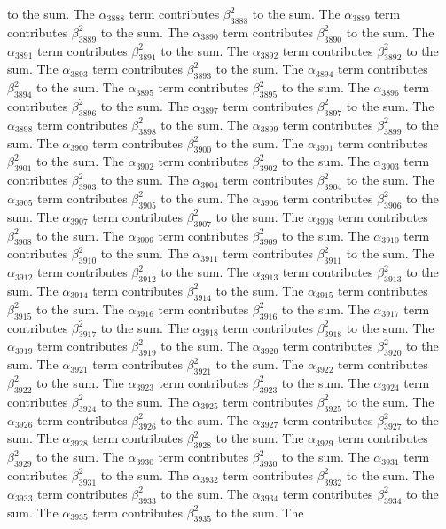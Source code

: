 \begin{lemma}
to the sum. The $\alpha_{3888}$ term contributes $\beta_{3888}^{2}$ to the sum. The $\alpha_{3889}$ term contributes $\beta_{3889}^{2}$ to the sum. The $\alpha_{3890}$ term contributes $\beta_{3890}^{2}$ to the sum. The $\alpha_{3891}$ term contributes $\beta_{3891}^{2}$ to the sum. The $\alpha_{3892}$ term contributes $\beta_{3892}^{2}$ to the sum. The $\alpha_{3893}$ term contributes $\beta_{3893}^{2}$ to the sum. The $\alpha_{3894}$ term contributes $\beta_{3894}^{2}$ to the sum. The $\alpha_{3895}$ term contributes $\beta_{3895}^{2}$ to the sum. The $\alpha_{3896}$ term contributes $\beta_{3896}^{2}$ to the sum. The $\alpha_{3897}$ term contributes $\beta_{3897}^{2}$ to the sum. The $\alpha_{3898}$ term contributes $\beta_{3898}^{2}$ to the sum. The $\alpha_{3899}$ term contributes $\beta_{3899}^{2}$ to the sum. The $\alpha_{3900}$ term contributes $\beta_{3900}^{2}$ to the sum. The $\alpha_{3901}$ term contributes $\beta_{3901}^{2}$ to the sum. The $\alpha_{3902}$ term contributes $\beta_{3902}^{2}$ to the sum. The $\alpha_{3903}$ term contributes $\beta_{3903}^{2}$ to the sum. The $\alpha_{3904}$ term contributes $\beta_{3904}^{2}$ to the sum. The $\alpha_{3905}$ term contributes $\beta_{3905}^{2}$ to the sum. The $\alpha_{3906}$ term contributes $\beta_{3906}^{2}$ to the sum. The $\alpha_{3907}$ term contributes $\beta_{3907}^{2}$ to the sum. The $\alpha_{3908}$ term contributes $\beta_{3908}^{2}$ to the sum. The $\alpha_{3909}$ term contributes $\beta_{3909}^{2}$ to the sum. The $\alpha_{3910}$ term contributes $\beta_{3910}^{2}$ to the sum. The $\alpha_{3911}$ term contributes $\beta_{3911}^{2}$ to the sum. The $\alpha_{3912}$ term contributes $\beta_{3912}^{2}$ to the sum. The $\alpha_{3913}$ term contributes $\beta_{3913}^{2}$ to the sum. The $\alpha_{3914}$ term contributes $\beta_{3914}^{2}$ to the sum. The $\alpha_{3915}$ term contributes $\beta_{3915}^{2}$ to the sum. The $\alpha_{3916}$ term contributes $\beta_{3916}^{2}$ to the sum. The $\alpha_{3917}$ term contributes $\beta_{3917}^{2}$ to the sum. The $\alpha_{3918}$ term contributes $\beta_{3918}^{2}$ to the sum. The $\alpha_{3919}$ term contributes $\beta_{3919}^{2}$ to the sum. The $\alpha_{3920}$ term contributes $\beta_{3920}^{2}$ to the sum. The $\alpha_{3921}$ term contributes $\beta_{3921}^{2}$ to the sum. The $\alpha_{3922}$ term contributes $\beta_{3922}^{2}$ to the sum. The $\alpha_{3923}$ term contributes $\beta_{3923}^{2}$ to the sum. The $\alpha_{3924}$ term contributes $\beta_{3924}^{2}$ to the sum. The $\alpha_{3925}$ term contributes $\beta_{3925}^{2}$ to the sum. The $\alpha_{3926}$ term contributes $\beta_{3926}^{2}$ to the sum. The $\alpha_{3927}$ term contributes $\beta_{3927}^{2}$ to the sum. The $\alpha_{3928}$ term contributes $\beta_{3928}^{2}$ to the sum. The $\alpha_{3929}$ term contributes $\beta_{3929}^{2}$ to the sum. The $\alpha_{3930}$ term contributes $\beta_{3930}^{2}$ to the sum. The $\alpha_{3931}$ term contributes $\beta_{3931}^{2}$ to the sum. The $\alpha_{3932}$ term contributes $\beta_{3932}^{2}$ to the sum. The $\alpha_{3933}$ term contributes $\beta_{3933}^{2}$ to the sum. The $\alpha_{3934}$ term contributes $\beta_{3934}^{2}$ to the sum. The $\alpha_{3935}$ term contributes $\beta_{3935}^{2}$ to the sum. The 
\end{lemma}
